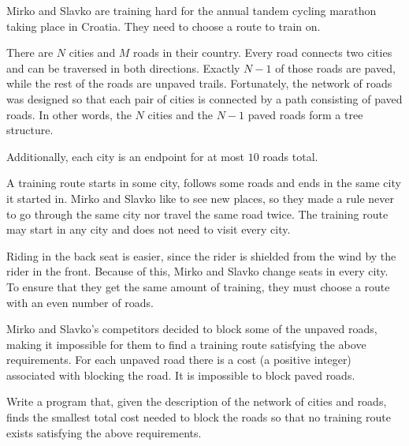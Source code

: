 Mirko and Slavko are training hard for the annual tandem cycling marathon taking place in Croatia. They need to choose a route to train on.

There are $N$ cities and $M$ roads in their country. Every road connects two cities and can be traversed in both directions. Exactly $N - 1$ of those roads are paved, while the rest of the roads are unpaved trails. Fortunately, the network of roads was designed so that each pair of cities is connected by a path consisting of paved roads. In other words, the $N$ cities and the $N - 1$ paved roads form a tree structure.

Additionally, each city is an endpoint for at most $10$ roads total.

A training route starts in some city, follows some roads and ends in the same city it started in. Mirko and Slavko like to see new places, so they made a rule never to go through the same city nor travel the same road twice. The training route may start in any city and does not need to visit every city.

Riding in the back seat is easier, since the rider is shielded from the wind by the rider in the front. Because of this, Mirko and Slavko change seats in every city. To ensure that they get the same amount of training, they must choose a route with an even number of roads.

Mirko and Slavko's competitors decided to block some of the unpaved roads, making it impossible for them to find a training route satisfying the above requirements. For each unpaved road there is a cost (a positive integer) associated with blocking the road. It is impossible to block paved roads.


Write a program that, given the description of the network of cities and roads, finds the smallest total cost needed to block the roads so that no training route exists satisfying the above requirements.